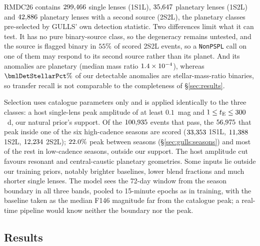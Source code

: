 \documentclass[twocolumn,linenumbers,floatfix,twocolappendix]{aastex701}
\begin{document}
RMDC26 contains $299{,}466$ single lenses (1S1L), $35{,}647$ planetary lenses (1S2L) and
$42{,}886$ planetary lenses with a second source (2S2L), the planetary classes pre-selected by GULLS' own
detection statistic. Two differences limit what it can test. It has no pure binary-source class, so the
\citet{Gaudi1998} degeneracy remains untested, and the source is flagged binary in $55\%$ of scored
2S2L events, so a \texttt{NonPSPL} call on one of them may respond to its second source rather than its planet. And
its anomalies are planetary (median mass ratio $1.4\times10^{-4}$), whereas $\bmlDetStellarPct\%$ of our
detectable anomalies are stellar-mass-ratio binaries, so transfer recall is not comparable to the completeness of
\S\ref{sec:results}.

Selection uses catalogue parameters only and is applied identically to the three classes: a host single-lens peak
amplitude of at least $0.1$~mag and $1 \le t_{\rm E} \le 300$~d, our natural prior's support. Of the
$100{,}935$ events that pass, the $56{,}975$ that peak inside one of the six high-cadence seasons are
scored ($33{,}353$ 1S1L, $11{,}388$ 1S2L, $12{,}234$ 2S2L); $22.0\%$ peak
between seasons (\S\ref{sec:gulls:seasons}) and most of the rest in low-cadence seasons, outside our support. The host
amplitude cut favours resonant and central-caustic planetary geometries. Some inputs lie outside our training priors, notably brighter baselines, lower blend fractions and much
shorter single lenses. The model sees the 72-day window from the season boundary in all three bands, pooled to 15-minute
epochs as in training, with the baseline taken as the median F146 magnitude far from the catalogue peak; a real-time
pipeline would know neither the boundary nor the peak.

\subsection{Results}\label{sec:gulls:results}
\end{document}
